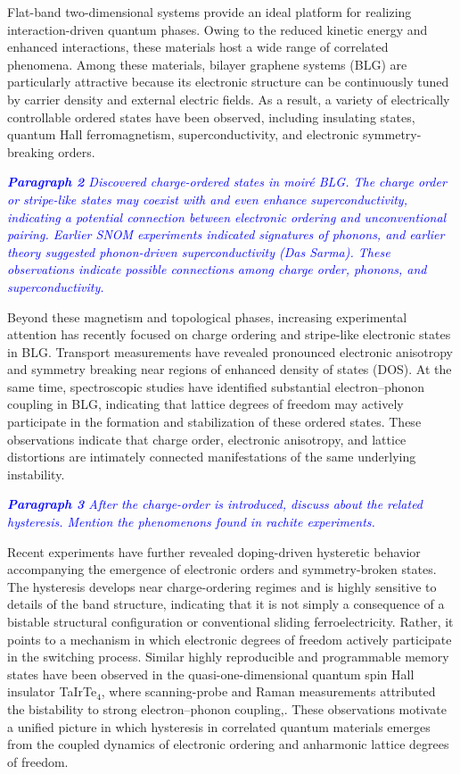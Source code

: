 \documentclass[aps,prx,article,twocolumn,amsmath,amssymb,superscriptaddress,longbibliography]{revtex4-2}
\begin{document}
Flat-band two-dimensional systems provide an ideal platform for realizing interaction-driven quantum phases. Owing to the reduced kinetic energy and enhanced interactions, these materials host a wide range of correlated phenomena. Among these materials, bilayer graphene systems (BLG) are particularly attractive because its electronic structure can be continuously tuned by carrier density and external electric fields. As a result, a variety of electrically controllable ordered states have been observed, including insulating states, quantum Hall ferromagnetism, superconductivity, and electronic symmetry-breaking orders.

\textcolor{blue}{\itshape \textbf{Paragraph 2}
Discovered charge-ordered states in moiré BLG. The charge order or stripe-like states may coexist with and even enhance superconductivity, indicating a potential connection between electronic ordering and unconventional pairing. Earlier SNOM experiments indicated signatures of phonons, and earlier theory suggested phonon-driven superconductivity (Das Sarma). These observations indicate possible connections among charge order, phonons, and superconductivity.}

Beyond these magnetism and topological phases, increasing experimental attention has recently focused on charge ordering and stripe-like electronic states in BLG. Transport measurements have revealed pronounced electronic anisotropy and symmetry breaking near regions of enhanced density of states (DOS). At the same time, spectroscopic studies have identified substantial electron--phonon coupling in BLG, indicating that lattice degrees of freedom may actively participate in the formation and stabilization of these ordered states. These observations indicate that charge order, electronic anisotropy, and lattice distortions are intimately connected manifestations of the same underlying instability.

\textcolor{blue}{\itshape \textbf{Paragraph 3}
After the charge-order is introduced, discuss about the related hysteresis. Mention the phenomenons found in rachite experiments.
}

Recent experiments have further revealed doping-driven hysteretic behavior accompanying the emergence of electronic orders and symmetry-broken states. The hysteresis develops near charge-ordering regimes and is highly sensitive to details of the band structure, indicating that it is not simply a consequence of a bistable structural configuration or conventional sliding ferroelectricity. Rather, it points to a mechanism in which electronic degrees of freedom actively participate in the switching process. Similar highly reproducible and programmable memory states have been observed in the quasi-one-dimensional quantum spin Hall insulator TaIrTe$_4$, where scanning-probe and Raman measurements attributed the bistability to strong electron--phonon coupling,\cite{tang2026bistable}. These observations motivate a unified picture in which hysteresis in correlated quantum materials emerges from the coupled dynamics of electronic ordering and anharmonic lattice degrees of freedom.
\end{document}
